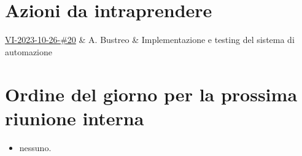 \documentclass[12pt]{article}
\begin{document}
    \section{Azioni da intraprendere}
    \begin{todo}
    	\href{https://github.com/QB-Software-swe/docs/issues/20}{VI-2023-10-26-\#20} 
    	& A. Bustreo
    	& Implementazione e testing del sistema di automazione 
    	\\\hline
    \end{todo}
    
    \section{Ordine del giorno per la prossima riunione interna}
    \begin{itemize}
    	\item nessuno.
    \end{itemize}
\end{document}
